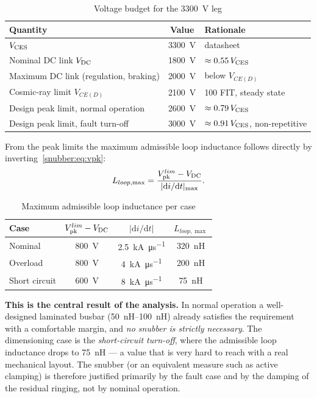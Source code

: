 \begin{table}[htbp]
\centering
\caption{Voltage budget for the \SI{3300}{\volt} leg}
\label{snubber:tab:budget}
\begin{tabular}{lcl}
\toprule
Quantity & Value & Rationale \\
\midrule
$V_{\mathrm{CES}}$                                & \SI{3300}{\volt} & datasheet \\
Nominal DC link $V_{\mathrm{DC}}$                 & \SI{1800}{\volt} & $\approx 0.55\,V_{\mathrm{CES}}$ \\
Maximum DC link (regulation, braking)  & \SI{2000}{\volt} & below $V_{CE(D)}$ \\
Cosmic-ray limit $V_{CE(D)}$           & \SI{2100}{\volt} & 100 FIT, steady state \\
Design peak limit, normal operation    & \SI{2600}{\volt} & $\approx 0.79\,V_{\mathrm{CES}}$ \\
Design peak limit, fault turn-off      & \SI{3000}{\volt} & $\approx 0.91\,V_{\mathrm{CES}}$, non-repetitive \\
\bottomrule
\end{tabular}
\end{table}

From the peak limits the maximum admissible loop inductance follows directly
by inverting~\eqref{snubber:eq:vpk}:
\begin{equation}
L_{loop,\max} = \frac{V_{\mathrm{pk}}^{lim} - V_{\mathrm{DC}}}{|\mathrm{d}i/\mathrm{d}t|_{\max}}.
\label{snubber:eq:lmax}
\end{equation}

\begin{table}[htbp]
\centering
\caption{Maximum admissible loop inductance per case}
\label{snubber:tab:lmax}
\begin{tabular}{lccc}
\toprule
Case & $V_{\mathrm{pk}}^{lim} - V_{\mathrm{DC}}$ & $|\mathrm{d}i/\mathrm{d}t|$ & $L_{loop,\max}$ \\
\midrule
Nominal       & \SI{800}{\volt} & \SI{2.5}{\kilo\ampere\per\micro\second} & \SI{320}{\nano\henry} \\
Overload      & \SI{800}{\volt} & \SI{4}{\kilo\ampere\per\micro\second}   & \SI{200}{\nano\henry} \\
Short circuit & \SI{600}{\volt} & \SI{8}{\kilo\ampere\per\micro\second}   & \SI{75}{\nano\henry} \\
\bottomrule
\end{tabular}
\end{table}

\textbf{This is the central result of the analysis.} In normal operation a
well-designed laminated busbar (\SIrange{50}{100}{\nano\henry}) already
satisfies the requirement with a comfortable margin, and \emph{no snubber is
strictly necessary}. The dimensioning case is the \emph{short-circuit
turn-off}, where the admissible loop inductance drops to
\SI{75}{\nano\henry} --- a value that is very hard to reach with a real
mechanical layout. The snubber (or an equivalent measure such as active
clamping) is therefore justified primarily by the fault case and by the
damping of the residual ringing, not by nominal operation.


